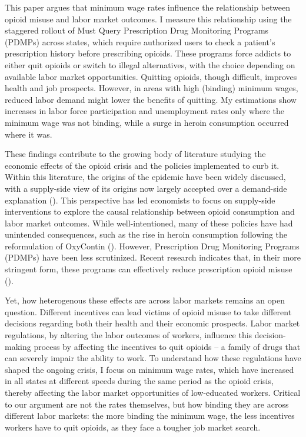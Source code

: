 \documentclass[12pt,a4paper]{article}
\begin{document}
This paper argues that minimum wage rates influence the relationship between opioid misuse and labor market outcomes.
I measure this relationship using the staggered rollout of Must Query Prescription Drug Monitoring Programs (PDMPs) across states, which require authorized users to check a patient's prescription history before prescribing opioids. 
These programs force addicts to either quit opioids or switch to illegal alternatives, with the choice depending on available labor market opportunities.
Quitting opioids, though difficult, improves health and job prospects.
However, in areas with high (binding) minimum wages, reduced labor demand might lower the benefits of quitting.
My estimations show increases in labor force participation and unemployment rates only where the minimum wage was not binding, while a surge in heroin consumption occurred where it was.

These findings contribute to the growing body of literature studying the economic effects of the opioid crisis and the policies implemented to curb it.
Within this literature, the origins of the epidemic have been widely discussed, with a supply-side view of its origins now largely accepted over a demand-side explanation (\cite{Ruhm2018}).
This perspective has led economists to focus on supply-side interventions to explore the causal relationship between opioid consumption and labor market outcomes.
While well-intentioned, many of these policies have had unintended consequences, such as the rise in heroin consumption following the reformulation of OxyContin (\cite{Alpert2018}).
However, Prescription Drug Monitoring Programs (PDMPs) have been less scrutinized.
Recent research indicates that, in their more stringent form, these programs can effectively reduce prescription opioid misuse (\cite{Buchmueller2018}).

Yet, how heterogenous these effects are across labor markets remains an open question.
Different incentives can lead victims of opioid misuse to take different decisions regarding both their health and their economic prospects. 
Labor market regulations, by altering the labor outcomes of workers, influence this decision-making process by affecting the incentives to quit opioids -- a family of drugs that can severely impair the ability to work.
To understand how these regulations have shaped the ongoing crisis, I focus on minimum wage rates, which have increased in all states at different speeds during the same period as the opioid crisis, thereby affecting the labor market opportunities of low-educated workers.
Critical to our argument are not the rates themselves, but how binding they are across different labor markets: the more binding the minimum wage, the less incentives workers have to quit opioids, as they face a tougher job market search.
\end{document}
